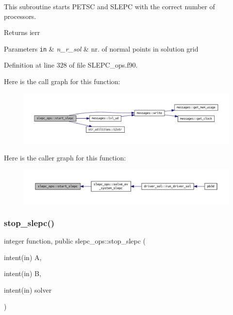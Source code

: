 This subroutine starts P\+E\+T\+SC and S\+L\+E\+PC with the correct number of processors. 

\begin{DoxyReturn}{Returns}
ierr
\end{DoxyReturn}

\begin{DoxyParams}[1]{Parameters}
\mbox{\tt in}  & {\em n\+\_\+r\+\_\+sol} & nr. of normal points in solution grid \\
\hline
\end{DoxyParams}


Definition at line 328 of file S\+L\+E\+P\+C\+\_\+ops.\+f90.

Here is the call graph for this function\+:\nopagebreak
\begin{figure}[H]
\begin{center}
\leavevmode
\includegraphics[width=350pt]{namespaceslepc__ops_a9cec5d9e8abc41d0d7ffb14352112040_cgraph}
\end{center}
\end{figure}
Here is the caller graph for this function\+:\nopagebreak
\begin{figure}[H]
\begin{center}
\leavevmode
\includegraphics[width=350pt]{namespaceslepc__ops_a9cec5d9e8abc41d0d7ffb14352112040_icgraph}
\end{center}
\end{figure}
\mbox{\label{namespaceslepc__ops_aeeac6908b3988f395314e7769829a058}} 
\subsubsection{\texorpdfstring{stop\+\_\+slepc()}{stop\_slepc()}}
{\footnotesize\ttfamily integer function, public slepc\+\_\+ops\+::stop\+\_\+slepc (\begin{DoxyParamCaption}\item[{intent(in)}]{A,  }\item[{intent(in)}]{B,  }\item[{intent(in)}]{solver }\end{DoxyParamCaption})}



